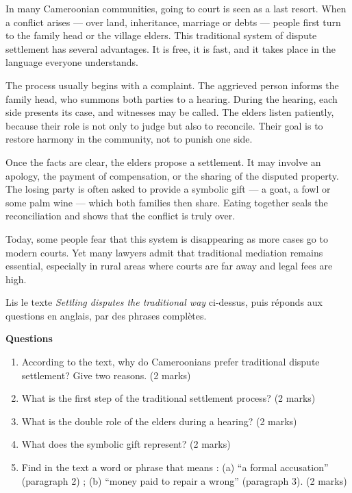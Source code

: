 \documentclass[11pt]{article}
\begin{document}
\begin{textebox}
In many Cameroonian communities, going to court is seen as a last resort. When a conflict arises — over land, inheritance, marriage or debts — people first turn to the family head or the village elders. This traditional system of dispute settlement has several advantages. It is free, it is fast, and it takes place in the language everyone understands.

The process usually begins with a complaint. The aggrieved person informs the family head, who summons both parties to a hearing. During the hearing, each side presents its case, and witnesses may be called. The elders listen patiently, because their role is not only to judge but also to reconcile. Their goal is to restore harmony in the community, not to punish one side.

Once the facts are clear, the elders propose a settlement. It may involve an apology, the payment of compensation, or the sharing of the disputed property. The losing party is often asked to provide a symbolic gift — a goat, a fowl or some palm wine — which both families then share. Eating together seals the reconciliation and shows that the conflict is truly over.

Today, some people fear that this system is disappearing as more cases go to modern courts. Yet many lawyers admit that traditional mediation remains essential, especially in rural areas where courts are far away and legal fees are high.
\end{textebox}

\begin{exercice}
Lis le texte \emph{Settling disputes the traditional way} ci-dessus, puis réponds aux questions en anglais, par des phrases complètes.

\textbf{Questions}
\begin{enumerate}
\item According to the text, why do Cameroonians prefer traditional dispute settlement? Give two reasons. (2 marks)
\item What is the first step of the traditional settlement process? (2 marks)
\item What is the double role of the elders during a hearing? (2 marks)
\item What does the symbolic gift represent? (2 marks)
\item Find in the text a word or phrase that means : (a) ``a formal accusation'' (paragraph 2) ; (b) ``money paid to repair a wrong'' (paragraph 3). (2 marks)
\end{enumerate}
\end{exercice}
\end{document}
